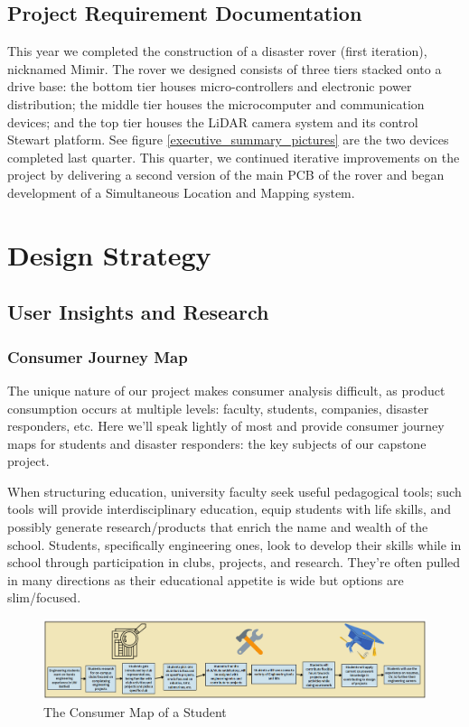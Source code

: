 \documentclass[a4paper, 10pt]{article}
\begin{document}
	\subsection*{Project Requirement Documentation}
	This year we completed the construction of a disaster rover (first iteration), nicknamed Mimir. The rover we designed consists of three tiers stacked onto a drive base: the bottom tier houses micro-controllers and electronic power distribution; the middle tier houses the microcomputer and communication devices; and the top tier houses the LiDAR camera system and its control Stewart platform. See figure \ref{executive_summary_pictures} are the two devices completed last quarter. This quarter, we continued iterative improvements on the project by delivering a second version of the main PCB of the rover and began development of a Simultaneous Location and Mapping system.
\pagebreak

\section{Design Strategy}
	\subsection{User Insights and Research} 
		\subsubsection{Consumer Journey Map}
		The unique nature of our project makes consumer analysis difficult, as product consumption occurs at multiple levels: faculty, students, companies, disaster responders, etc. Here we'll speak lightly of most and provide consumer journey maps for students and disaster responders: the key subjects of our capstone project.
		
		When structuring education, university faculty seek useful pedagogical tools; such tools will provide  interdisciplinary education, equip students with life skills, and possibly generate research/products that enrich the name and wealth of the school. Students, specifically engineering ones, look to develop their skills while in school through participation in clubs, projects, and research. They're often pulled in many directions as their educational appetite is wide but options are slim/focused.
		
		\begin{figure} [!h]
			\centering
			\includegraphics[scale=0.4]{Photos/Student Consumer Map}
			\caption{The Consumer Map of a Student}
			\label{consumer_map_student}
		\end{figure}
		
\end{document}
